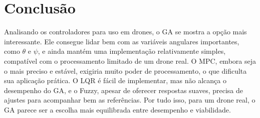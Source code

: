\section{Conclusão}
Analisando os controladores para uso em drones, o GA se mostra a opção mais interessante. Ele 
consegue lidar bem com as variáveis angulares importantes, como $\theta$ e $\psi$, e ainda mantém 
uma implementação relativamente simples, compatível com o processamento limitado de um drone real. 
O MPC, embora seja o mais preciso e estável, exigiria muito poder de processamento, o que dificulta 
sua aplicação prática. O LQR é fácil de implementar, mas não alcança o desempenho do GA, e o Fuzzy, 
apesar de oferecer respostas suaves, precisa de ajustes para acompanhar bem as referências. Por 
tudo isso, para um drone real, o GA parece ser a escolha mais equilibrada entre desempenho e 
viabilidade.